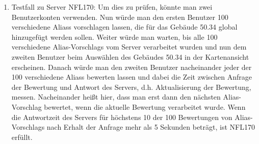 \begin{enumerate}[label=\textbf{/T\arabic*0/}, align=left]
	\item Testfall zu Server NFL170: Um dies zu prüfen, könnte man zwei \Gls{Benutzer}konten verwenden. Nun würde man den ersten \Gls{Benutzer} 100 verschiedene \Glspl{Alias} vorschlagen lassen, die für das Gebäude 50.34 \gls{global} hinzugefügt werden sollen. Weiter würde man warten, bis alle 100 verschiedene \Glspl{Alias-Vorschlag} vom \Gls{Server} verarbeitet wurden und nun dem zweiten \Gls{Benutzer} beim Auswählen des Gebäudes 50.34 in der \Gls{Kartenansicht} erscheinen. Danach würde man den zweiten \Gls{Benutzer} nacheinander jeder der 100 verschiedene \Glspl{Alias} bewerten lassen und dabei die Zeit zwischen Anfrage der Bewertung und Antwort des \Gls{Server}s, d.h. Aktualisierung der Bewertung, messen. Nacheinander heißt hier, dass man erst dann den nächsten \Gls{Alias-Vorschlag} bewertet, wenn die aktuelle Bewertung verarbeitet wurde. Wenn die Antwortzeit des \Gls{Server}s für höchstens 10 der 100 Bewertungen von \Glspl{Alias-Vorschlag} nach Erhalt der Anfrage mehr als 5 Sekunden beträgt, ist NFL170 erfüllt.
\end{enumerate}